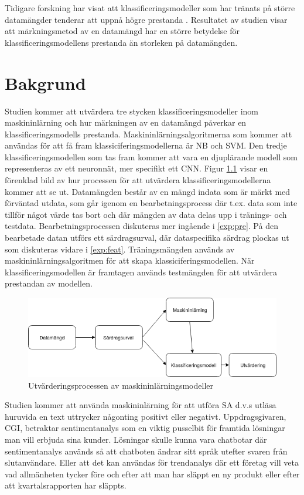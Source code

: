 \documentclass{kaumasters} %
\begin{document}
Tidigare forskning har visat att klassificeringsmodeller som har tränats på större datamängder tenderar att uppnå högre prestanda \cite{TSAsurvey}. Resultatet av studien visar att märkningsmetod av en datamängd har en större betydelse för klassificeringsmodellens prestanda än storleken på datamängden. 

\chapter{Bakgrund}\label{bak}
Studien kommer att utvärdera tre stycken klassificeringsmodeller inom maskininlärning och hur märkningen av en datamängd påverkar en klassificeringsmodells prestanda. Maskininlärningsalgoritmerna som kommer att användas för att få fram klassiciferingsmodellerna är NB och SVM. Den tredje klassificeringsmodellen som tas fram kommer att vara en djuplärande modell som representeras av ett neuronnät, mer specifikt ett CNN. Figur \ref{fig:overfig} visar en förenklad bild av hur processen för att utvärdera klassificeringsmodellerna kommer att se ut. Datamängden består av en mängd indata som är märkt med förväntad utdata, som går igenom en bearbetningsprocess där t.ex. data som inte tillför något värde tas bort och där mängden av data delas upp i tränings- och testdata.  Bearbetningsprocessen diskuteras mer ingående i \ref{exp:pre}. På den bearbetade datan utförs ett särdragsurval, där dataspecifika särdrag plockas ut som diskuteras vidare i \ref{exp:feat}. Träningsmängden används av maskininlärningsalgoritmen för att skapa klassiciferingsmodellen. När klassificeringsmodellen är framtagen används testmängden för att utvärdera prestandan av modellen.

\begin{figure}[h]
\includegraphics[width=12cm]{oversiktsfigur}
\centering
\caption{Utvärderingsprocessen av maskininlärningsmodeller}
\label{fig:overfig}
\end{figure}

Studien kommer att använda maskininlärning för att utföra SA d.v.s utläsa huruvida en text uttrycker någonting positivt eller negativt. Uppdragsgivaren, CGI, betraktar sentimentanalys  som en viktig pusselbit för framtida lösningar man vill erbjuda sina kunder. Lösningar skulle kunna vara chatbotar där sentimentanalys används så att chatboten ändrar sitt språk utefter svaren från slutanvändare. Eller att det kan användas för trendanalys där ett företag vill veta vad allmänheten tycker före och efter att man har släppt en ny produkt eller efter att kvartalsrapporten har släppts.
\end{document}
